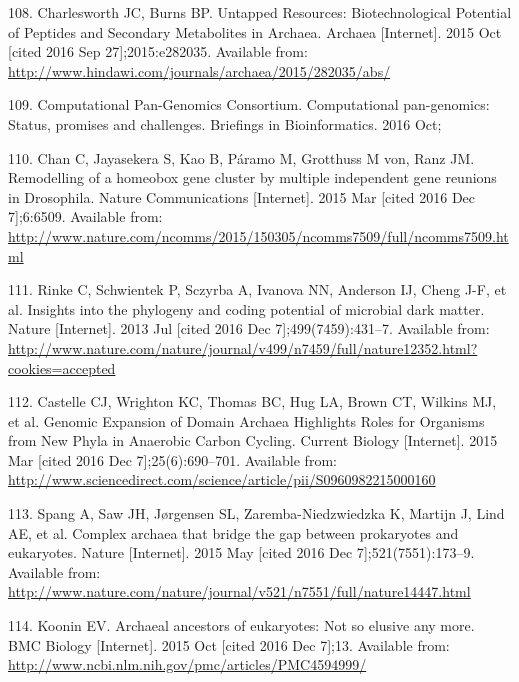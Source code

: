 \documentclass[12pt,twoside]{reedthesis}
\begin{document}
  \hypertarget{ref-charlesworth_untapped_2015}{}
  108. Charlesworth JC, Burns BP. Untapped Resources: Biotechnological
  Potential of Peptides and Secondary Metabolites in Archaea. Archaea
  {[}Internet{]}. 2015 Oct {[}cited 2016 Sep 27{]};2015:e282035. Available
  from: \url{http://www.hindawi.com/journals/archaea/2015/282035/abs/}
  
  \hypertarget{ref-computational_pan-genomics_consortium_computational_2016}{}
  109. Computational Pan-Genomics Consortium. Computational pan-genomics:
  Status, promises and challenges. Briefings in Bioinformatics. 2016 Oct;
  
  \hypertarget{ref-chan_remodelling_2015}{}
  110. Chan C, Jayasekera S, Kao B, Páramo M, Grotthuss M von, Ranz JM.
  Remodelling of a homeobox gene cluster by multiple independent gene
  reunions in Drosophila. Nature Communications {[}Internet{]}. 2015 Mar
  {[}cited 2016 Dec 7{]};6:6509. Available from:
  \url{http://www.nature.com/ncomms/2015/150305/ncomms7509/full/ncomms7509.html}
  
  \hypertarget{ref-rinke_insights_2013}{}
  111. Rinke C, Schwientek P, Sczyrba A, Ivanova NN, Anderson IJ, Cheng
  J-F, et al. Insights into the phylogeny and coding potential of
  microbial dark matter. Nature {[}Internet{]}. 2013 Jul {[}cited 2016 Dec
  7{]};499(7459):431--7. Available from:
  \url{http://www.nature.com/nature/journal/v499/n7459/full/nature12352.html?cookies=accepted}
  
  \hypertarget{ref-castelle_genomic_2015}{}
  112. Castelle CJ, Wrighton KC, Thomas BC, Hug LA, Brown CT, Wilkins MJ,
  et al. Genomic Expansion of Domain Archaea Highlights Roles for
  Organisms from New Phyla in Anaerobic Carbon Cycling. Current Biology
  {[}Internet{]}. 2015 Mar {[}cited 2016 Dec 7{]};25(6):690--701.
  Available from:
  \url{http://www.sciencedirect.com/science/article/pii/S0960982215000160}
  
  \hypertarget{ref-spang_complex_2015}{}
  113. Spang A, Saw JH, Jørgensen SL, Zaremba-Niedzwiedzka K, Martijn J,
  Lind AE, et al. Complex archaea that bridge the gap between prokaryotes
  and eukaryotes. Nature {[}Internet{]}. 2015 May {[}cited 2016 Dec
  7{]};521(7551):173--9. Available from:
  \url{http://www.nature.com/nature/journal/v521/n7551/full/nature14447.html}
  
  \hypertarget{ref-koonin_archaeal_2015}{}
  114. Koonin EV. Archaeal ancestors of eukaryotes: Not so elusive any
  more. BMC Biology {[}Internet{]}. 2015 Oct {[}cited 2016 Dec 7{]};13.
  Available from:
  \url{http://www.ncbi.nlm.nih.gov/pmc/articles/PMC4594999/}
  
\end{document}
